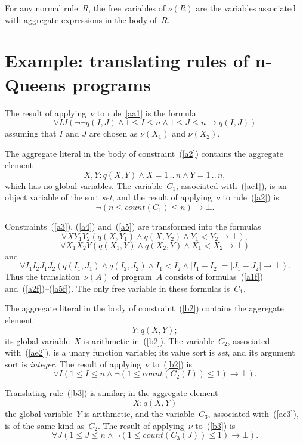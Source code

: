 \documentclass[11pt]{article}
\def\rar{\rightarrow}
\def\beq{\begin{equation}}
\def\eeq#1{\label{#1}\end{equation}}
\newcommand{\co}{\ensuremath{\mathit{count}}}
\begin{document}
\begin{adjustwidth}{-1cm}{-1cm}
For any normal rule~$R$, the free variables of $\nu(R)$ are the variables
associated with aggregate expressions in the body of~$R$.


\section{Example: translating rules of n-Queens programs}
\label{sec:examples-nu}

The result of applying~$\nu$ to rule~\eqref{aa1} is the formula
\beq
\forall I J (\neg\neg q(I,J) \land 1\leq I \leq n \land 1 \leq J \leq n \to q(I,J))
\eeq{a1f}
assuming that $I$ and $J$ are chosen as $\nu(X_1)$ and $\nu(X_2)$.

The aggregate literal in the body of constraint~(\ref{a2}) contains the
aggregate element
\beq
X,Y : q(X,Y) \land X = 1\,..\,n \land Y = 1\,..\,n,
\eeq{ae1}
which has no global variables.  The variable~$C_1$, associated
with~(\ref{ae1}), is an object variable of the sort \emph{set}, and the
result of applying~$\nu$ to rule~(\ref{a2}) is
\beq
\neg (n\leq \co(C_1)\leq n)\rar\bot.
\eeq{a2f}

Constraints~(\ref{a3}), (\ref{a4}) and~(\ref{a5}) are transformed into the
formulas
\beq
\forall XY_1Y_2(q(X,Y_1) \land q(X,Y_2) \land Y_1 < Y_2 \to \bot),
\eeq{a3f}
\beq
\forall X_1X_2Y(q(X_1,Y) \land q(X_2,Y) \land X_1 < X_2 \to \bot)
\eeq{a4f}
and
\beq
\forall I_1I_2J_1J_2
(q(I_1,J_1) \land q(I_2,J_2) \land I_1<I_2 \land |I_1-I_2|=|J_1-J_2| \to\bot).
\eeq{a5f}
Thus the translation~$\nu(A)$ of program~$A$ consists of
formulas~(\ref{a1f}) and~(\ref{a2f})--(\ref{a5f}).  The
only free variable in these formulas is~$C_1$.

The aggregate literal in the body of constraint~(\ref{b2}) contains the
aggregate element
\beq
Y : q(X,Y);
\eeq{ae2}
its global variable~$X$ is arithmetic in~(\ref{b2}).  The variable~$C_2$,
associated with~(\ref{ae2}), is a unary function variable; its value sort
is \emph{set}, and its argument sort is \emph{integer}.
The result of applying~$\nu$ to~(\ref{b2}) is
\beq
\forall I(1\leq I\leq n \land \neg (1\leq \co(C_2(I))\leq 1)\to \bot).
\eeq{b2f}

Translating rule~(\ref{b3}) is similar; in the aggregate element
\beq
X : q(X,Y)
\eeq{ae3}
the global variable~$Y$ is arithmetic, and the variable~$C_3$,
associated with~(\ref{ae3}), is of the same kind as~$C_2$.
The result of applying~$\nu$ to~(\ref{b3}) is
\beq
\forall J(1\leq J\leq n \land \neg (1\leq \co(C_3(J))\leq 1)\to \bot).
\eeq{b3f}


\end{adjustwidth}
\end{document}
